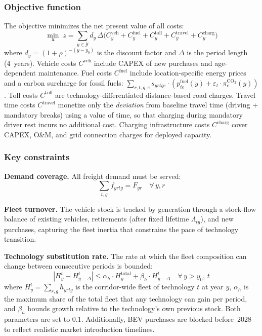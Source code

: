 \documentclass[conference]{IEEEtran}
\begin{document}
\subsubsection{Objective function}
The objective minimizes the net present value of all costs:
\begin{equation} \label{equ:obj}
    \min_{\mathbf{x}}\; z = \sum_{y \in \mathcal{Y}} d_y \,\Delta \Big( C^{\mathrm{veh}}_y + C^{\mathrm{fuel}}_y + C^{\mathrm{toll}}_y + C^{\mathrm{travel}}_y + C^{\mathrm{charg}}_y \Big)
\end{equation}
where $d_y = (1+\rho)^{-(y-y_0)}$ is the discount factor and $\Delta$ is the period length (4~years). Vehicle costs $C^{\mathrm{veh}}$ include CAPEX of new purchases and age-dependent maintenance. Fuel costs $C^{\mathrm{fuel}}$ include location-specific energy prices and a carbon surcharge for fossil fuels: $\sum_{r,t,g,e} s_{yrtge} \cdot ( p^{\mathrm{fuel}}_{te}(y) + \varepsilon_t \cdot \pi^{\mathrm{CO_2}}_e(y))$. Toll costs $C^{\mathrm{toll}}$ are technology-differentiated distance-based road charges. Travel time costs $C^{\mathrm{travel}}$ monetize only the \emph{deviation} from baseline travel time (driving + mandatory breaks) using a value of time, so that charging during mandatory driver rest incurs no additional cost. Charging infrastructure costs $C^{\mathrm{charg}}$ cover CAPEX, O\&M, and grid connection charges for deployed capacity.

\subsubsection{Key constraints}

\textbf{Demand coverage.} All freight demand must be served:
\begin{equation}
    \sum_{t,g} f_{yrtg} = F_{yr} \quad \forall\, y, r
\end{equation}

\textbf{Fleet turnover.} The vehicle stock is tracked by generation through a stock-flow balance of existing vehicles, retirements (after fixed lifetime $\Lambda_{tg}$), and new purchases, capturing the fleet inertia that constrains the pace of technology transition.

\textbf{Technology substitution rate.} The rate at which the fleet composition can change between consecutive periods is bounded:
\begin{equation}
    \left| H^{t}_{y} - H^{t}_{y-\Delta} \right| \leq \alpha_h \cdot H^{\mathrm{total}}_{y} + \beta_h \cdot H^{t}_{y-\Delta} \quad \forall\, y > y_0,\, t
\end{equation}
where $H^{t}_{y} = \sum_{r,g} h_{yrtg}$ is the corridor-wide fleet of technology $t$ at year $y$, $\alpha_h$ is the maximum share of the total fleet that any technology can gain per period, and $\beta_h$ bounds growth relative to the technology's own previous stock. Both parameters are set to 0.1. Additionally, BEV purchases are blocked before~2028 to reflect realistic market introduction timelines.
\end{document}
